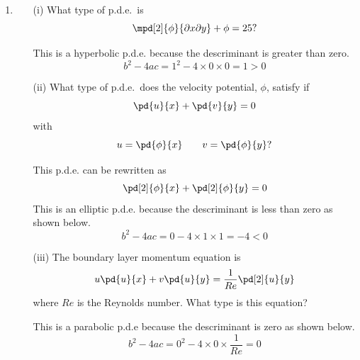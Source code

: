 \documentclass[11pt, oneside]{article}
\begin{document}
\begin{enumerate}
\begin{enumerate}
\begin{center}
        \end{center}
    \end{enumerate}

  \item %
    \begin{enumerate}
      \item[(i)] %
        What type of p.d.e.\ is
        \[
          \mpd[2]{\phi}{\partial x \partial y} + \phi = 25?
        \]

        This is a hyperbolic p.d.e. because the descriminant is
        greater than zero.
        \[
          b^2 - 4ac = 1^2 - 4 \times 0 \times 0 = 1 > 0
        \]

      \item[(ii)] %
        What type of p.d.e.\ does the velocity potential, $\phi$, satisfy if
        \[
          \pd{u}{x} + \pd{v}{y} = 0
        \]
        with
        \[
          u = \pd{\phi}{x} \qquad v = \pd{\phi}{y}?
        \]

        This p.d.e. can be rewritten as
        \[
          \pd[2]{\phi}{x} + \pd[2]{\phi}{y} = 0
        \]
        This is an elliptic p.d.e. because the descriminant is less than zero
        as shown below.
        \[
          b^2 - 4ac = 0 - 4\times 1 \times 1 = -4 < 0
        \]

      \item[(iii)] %
        The boundary layer momentum equation is
        \[
          u \pd{u}{x} + v \pd{u}{y} = \frac{1}{Re} \pd[2]{u}{y}
        \]
        where $Re$ is the Reynolds number.
        What type is this equation?

        This is a parabolic p.d.e because the descriminant is zero as shown
        below.
        \[
          b^2 - 4ac = 0^2 - 4 \times 0 \times \frac{1}{Re} = 0
        \]
    \end{enumerate}
\end{enumerate}
\end{document}
